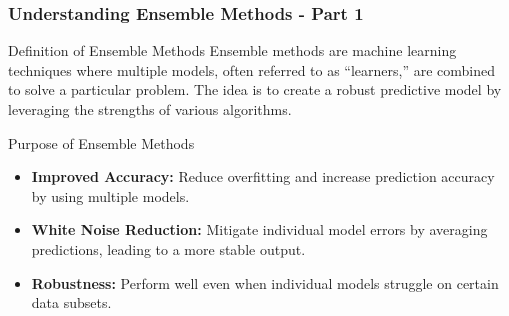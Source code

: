 \documentclass[aspectratio=169]{beamer}
\begin{document}
\begin{frame}[fragile]
    \frametitle{Understanding Ensemble Methods - Part 1}
    \begin{block}{Definition of Ensemble Methods}
        Ensemble methods are machine learning techniques where multiple models, often referred to as “learners,” are combined to solve a particular problem. The idea is to create a robust predictive model by leveraging the strengths of various algorithms.
    \end{block}
    
    \begin{block}{Purpose of Ensemble Methods}
        \begin{itemize}
            \item \textbf{Improved Accuracy:} Reduce overfitting and increase prediction accuracy by using multiple models.
            \item \textbf{White Noise Reduction:} Mitigate individual model errors by averaging predictions, leading to a more stable output.
            \item \textbf{Robustness:} Perform well even when individual models struggle on certain data subsets.
        \end{itemize}
    \end{block}
\end{frame}
\end{document}
